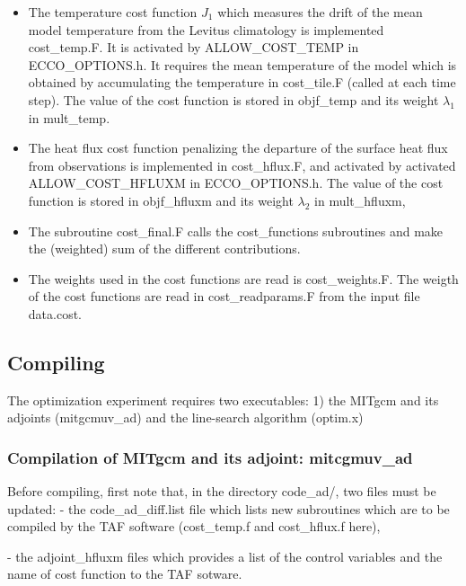 \begin{itemize}

\item The temperature cost function $J_1$ which measures the drift of the mean model
temperature from the Levitus climatology is implemented cost\_temp.F. It is
activated by ALLOW\_COST\_TEMP in ECCO\_OPTIONS.h. It requires the mean temperature of
the model which is obtained by accumulating the temperature in cost\_tile.F (called at
each time step).
The value of the cost function is stored in objf\_temp and its weight $\lambda_1$
in mult\_temp.

\item The heat flux cost function penalizing the departure of the surface heat flux from
observations is implemented in cost\_hflux.F, and activated by activated
ALLOW\_COST\_HFLUXM in ECCO\_OPTIONS.h. The value of the cost function is stored in
objf\_hfluxm and its weight $\lambda_2$ in mult\_hfluxm,

\item The subroutine cost\_final.F calls the cost\_functions subroutines
and make the (weighted) sum of the different contributions.

\item The weights used in the cost functions are read is cost\_weights.F.
The weigth of the cost functions are read in cost\_readparams.F from the input file
data.cost.    

\end{itemize}

\subsection{Compiling} 

The optimization experiment requires two executables: 1) the 
MITgcm and its adjoints (mitgcmuv\_ad) and the line-search algorithm (optim.x) 

\subsubsection{Compilation of MITgcm and its adjoint: mitcgmuv\_ad}

Before compiling, first note that, in the directory code\_ad/, two files
must be updated:
- the code\_ad\_diff.list file which lists new subroutines which are to be compiled
by the TAF software (cost\_temp.f and cost\_hflux.f here),

- the adjoint\_hfluxm files which provides a list of the control variables and the
name of cost function to the TAF sotware.

